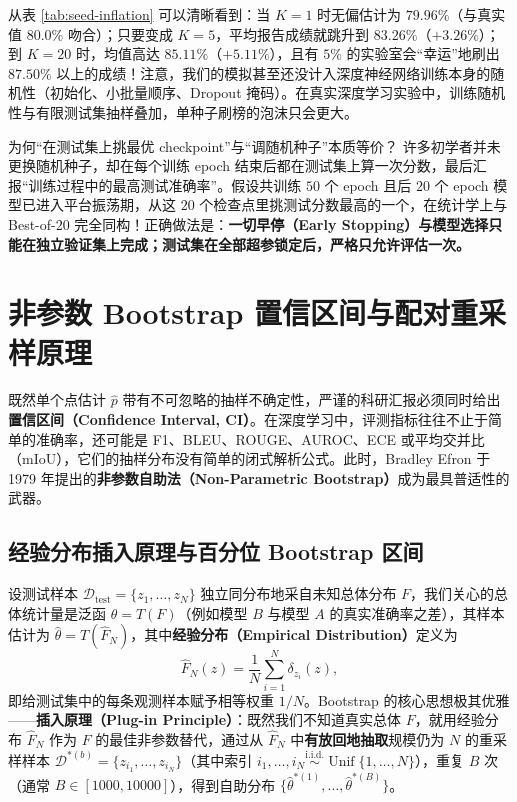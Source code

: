 从表 \ref{tab:seed-inflation} 可以清晰看到：当 $K=1$ 时无偏估计为 $79.96\%$（与真实值 $80.0\%$ 吻合）；只要变成 $K=5$，平均报告成绩就跳升到 $83.26\%$（$+3.26\%$）；到 $K=20$ 时，均值高达 $85.11\%$（$+5.11\%$），且有 $5\%$ 的实验室会“幸运”地刷出 $87.50\%$ 以上的成绩！注意，我们的模拟甚至还没计入深度神经网络训练本身的随机性（初始化、小批量顺序、Dropout 掩码）。在真实深度学习实验中，训练随机性与有限测试集抽样叠加，单种子刷榜的泡沫只会更大。

\begin{insightBox}{为何“在测试集上挑最优 checkpoint”与“调随机种子”本质等价？}
许多初学者并未更换随机种子，却在每个训练 epoch 结束后都在测试集上算一次分数，最后汇报“训练过程中的最高测试准确率”。假设共训练 $50$ 个 epoch 且后 $20$ 个 epoch 模型已进入平台振荡期，从这 $20$ 个检查点里挑测试分数最高的一个，在统计学上与 Best-of-$20$ 完全同构！正确做法是：\textbf{一切早停（Early Stopping）与模型选择只能在独立验证集上完成；测试集在全部超参锁定后，严格只允许评估一次。}
\end{insightBox}

\section{非参数 Bootstrap 置信区间与配对重采样原理}

既然单个点估计 $\hat{p}$ 带有不可忽略的抽样不确定性，严谨的科研汇报必须同时给出\textbf{置信区间（Confidence Interval, CI）}。在深度学习中，评测指标往往不止于简单的准确率，还可能是 F1、BLEU、ROUGE、AUROC、ECE 或平均交并比（mIoU），它们的抽样分布没有简单的闭式解析公式。此时，Bradley Efron 于 1979 年提出的\textbf{非参数自助法（Non-Parametric Bootstrap）}成为最具普适性的武器。

\subsection{经验分布插入原理与百分位 Bootstrap 区间}

设测试样本 $\mathcal{D}_{\text{test}} = \{z_1,\dots,z_N\}$ 独立同分布地采自未知总体分布 $F$，我们关心的总体统计量是泛函 $\theta = T(F)$（例如模型 $B$ 与模型 $A$ 的真实准确率之差），其样本估计为 $\hat{\theta} = T(\hat{F}_N)$，其中\textbf{经验分布（Empirical Distribution）}定义为
\[
  \hat{F}_N(z) = \frac{1}{N} \sum_{i=1}^N \delta_{z_i}(z),
\]
即给测试集中的每条观测样本赋予相等权重 $1/N$。Bootstrap 的核心思想极其优雅——\textbf{插入原理（Plug-in Principle）}：既然我们不知道真实总体 $F$，就用经验分布 $\hat{F}_N$ 作为 $F$ 的最佳非参数替代，通过从 $\hat{F}_N$ 中\textbf{有放回地抽取}规模仍为 $N$ 的重采样样本 $\mathcal{D}^{*(b)} = \{z_{i_1},\dots,z_{i_N}\}$（其中索引 $i_1,\dots,i_N \stackrel{\text{i.i.d.}}{\sim} \operatorname{Unif}\{1,\dots,N\}$），重复 $B$ 次（通常 $B \in [1000, 10000]$），得到自助分布 $\{\hat{\theta}^{*(1)}, \dots, \hat{\theta}^{*(B)}\}$。


